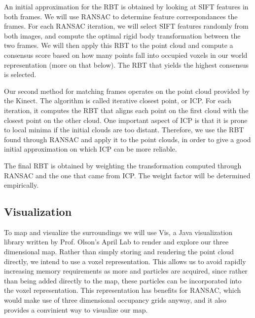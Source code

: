 \documentclass[12pt]{article}
\begin{document}
An initial approximation for the RBT is obtained by looking at SIFT features in both frames. We will use RANSAC to determine feature correspondances the frames.  For each RANSAC iteration, we will select SIFT features randomly from both images, and compute the optimal rigid body transformation between the two frames.  We will then apply this RBT to the point cloud and compute a consensus score based on how many points fall into occupied voxels in our world representation (more on that below).  The RBT that yields the highest consensus is selected.

Our second method for matching frames operates on the point cloud provided by the Kinect. The algorithm is called iterative closest point, or ICP. For each iteration, it computes the RBT that aligns each point on the first cloud with the closest point on the other cloud. One important aspect of ICP is that it is prone to local minima if the initial clouds are too distant. Therefore, we use the RBT found through RANSAC and apply it to the point clouds, in order to give a good initial approximation on which ICP can be more reliable.

The final RBT is obtained by weighting the transformation computed through RANSAC and the one that came from ICP. The weight factor will be determined empirically.


\subsection{Visualization}
To map and visualize the surroundings we will use Vis, a Java visualization library written by Prof. Olson's April Lab to render and explore our three dimensional map. Rather than simply storing and rendering the point cloud directly, we intend to use a voxel representation.  This allows us to avoid rapidly increasing memory requirements as more and particles are acquired, since rather than being added directly to the map, these particles can be incorporated into the voxel representation.  This representation has benefits for RANSAC, which would make use of three dimensional occupancy grids anyway, and it also provides a convinient way to visualize our map.
\end{document}
